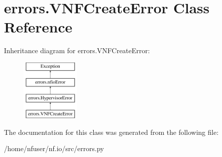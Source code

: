\hypertarget{classerrors_1_1VNFCreateError}{\section{errors.\-V\-N\-F\-Create\-Error Class Reference}
\label{classerrors_1_1VNFCreateError}
}
Inheritance diagram for errors.\-V\-N\-F\-Create\-Error\-:\begin{figure}[H]
\begin{center}
\leavevmode
\includegraphics[height=3.000000cm]{classerrors_1_1VNFCreateError}
\end{center}
\end{figure}


The documentation for this class was generated from the following file\-:\begin{DoxyCompactItemize}
\item 
/home/nfuser/nf.\-io/src/errors.\-py\end{DoxyCompactItemize}
